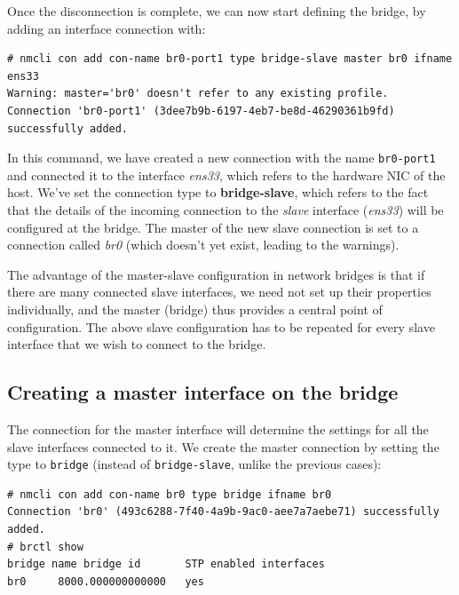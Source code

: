 \noindent
Once the disconnection is complete, we can now start defining the bridge, by adding an interface connection with:

\vspace{-15pt}
\begin{verbatim}
# nmcli con add con-name br0-port1 type bridge-slave master br0 ifname ens33 
Warning: master='br0' doesn't refer to any existing profile.
Connection 'br0-port1' (3dee7b9b-6197-4eb7-be8d-46290361b9fd) successfully added.
\end{verbatim}
\vspace{-10pt}	

\noindent
In this command, we have created a new connection with the name \verb|br0-port1| and connected it to the interface \textit{ens33}, which refers to the hardware NIC of the host. We've set the connection type to \textbf{bridge-slave}, which refers to the fact that the details of the incoming connection to the \textit{slave} interface (\textit{ens33}) will be configured at the bridge. The master of the new slave connection is set to a connection called \textit{br0} (which doesn't yet exist, leading to the warnings).

The advantage of the master-slave configuration in network bridges is that if there are many connected slave interfaces, we need not set up their properties individually, and the master (bridge) thus provides a central point of configuration. The above slave configuration has to be repeated for every slave interface that we wish to connect to the bridge. 

\subsection{Creating a master interface on the bridge}
The connection for the master interface will determine the settings for all the slave interfaces connected to it. We create the master connection by setting the type to \verb|bridge| (instead of \verb|bridge-slave|, unlike the previous cases):

\vspace{-15pt}
\begin{verbatim}
# nmcli con add con-name br0 type bridge ifname br0
Connection 'br0' (493c6288-7f40-4a9b-9ac0-aee7a7aebe71) successfully added.
# brctl show
bridge name	bridge id		STP enabled	interfaces
br0		8000.000000000000	yes			
\end{verbatim}
\vspace{-10pt}	

